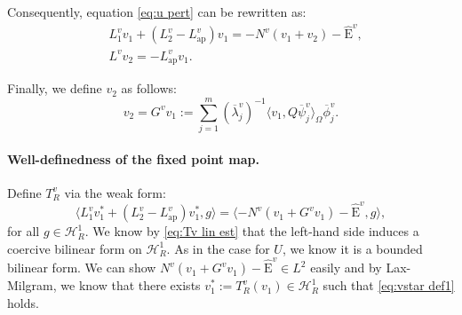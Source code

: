 \documentclass[11pt,a4paper]{article}
\numberwithin{equation}{section}
\newcommand{\Epsilon}{\mathrm{E}}
\newcommand{\assign}{:=}
\newcommand{\tmop}[1]{\ensuremath{\operatorname{#1}}}
\begin{document}
Consequently, equation \eqref{eq:u pert} can be rewritten as:
\begin{align*}
  &L_1^v v_1 + (L_2^v - L_{\tmop{ap}}^{v}) v_1  = -N^v (v_1 + v_2) -
  \widehat{\Epsilon}^v, \\
  &L^v v_2  =  -L_{\tmop{ap}}^{v} v_1 . 
\end{align*}

Finally, we define $v_2$ as follows:
\begin{equation}\label{v2 def}
    v_2 = G^{v} v_1 \assign \sum_{j = 1}^m (\overline{\lambda}_j^v)^{-1}\langle v_1, Q\overline\psi_j^v \rangle_{
  \Omega} 
   \overline\phi_j^v .
\end{equation}  


\paragraph{Well-definedness of the fixed point map.}
Define $T^v_R$ via the weak form:
\begin{equation}  \langle L_1^v v^{\ast}_1 + (L_2^v - L_{\tmop{ap}}^{v}) v^{\ast}_1 , g \rangle =  \langle-N^v (v_1 + G^{v} v_1) - \widehat{\Epsilon}^v ,g \rangle, \label{eq:vstar def1}
\end{equation}
 for all $g\in \mathcal{H}^1_R$. We know by \eqref{eq:Tv lin est} that the left-hand side induces a coercive bilinear form on $\mathcal{H}^1_R$. As in the case for $U$, we know it is a bounded bilinear form. We can show $N^v (v_1 + G^{v} v_1) - \widehat{\Epsilon}^v\in L^2$ easily and by Lax-Milgram, we know that there exists $v_1^{\ast}\assign T_R^v(v_1)\in\mathcal{H}^1_R$ such that \eqref{eq:vstar def1} holds.
\end{document}
